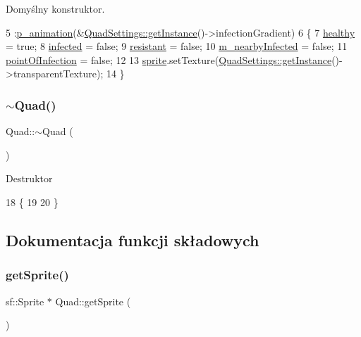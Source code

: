 Domyślny konstruktor. 
\begin{DoxyCode}
5           :\mbox{\hyperlink{class_quad_ace5b5f07a650f624aeb07806bc34d3f6}{p\_animation}}(&\mbox{\hyperlink{class_quad_settings_a20d7cfd0c56c11adcdf75c5e3011de67}{QuadSettings::getInstance}}()->infectionGradient)
6 \{
7     \mbox{\hyperlink{class_quad_a4994c09af588aeb08c482ea46494a08c}{healthy}} = \textcolor{keyword}{true};
8     \mbox{\hyperlink{class_quad_ae439ca631a9f51147b9d84a9c9df49c4}{infected}} = \textcolor{keyword}{false};
9     \mbox{\hyperlink{class_quad_ae2197ad46a2d7e409b2ca9e7ac25a80c}{resistant}} = \textcolor{keyword}{false};
10     \mbox{\hyperlink{class_quad_a6ccb745d5e70603957948d681b60e0f8}{m\_nearbyInfected}} = \textcolor{keyword}{false};
11     \mbox{\hyperlink{class_quad_a033c364211aab4e91aeb1609d4d890fe}{pointOfInfection}} = \textcolor{keyword}{false};
12 
13     \mbox{\hyperlink{class_quad_a83667bb824c1d6eca6c9c8b6e6d07d06}{sprite}}.setTexture(\mbox{\hyperlink{class_quad_settings_a20d7cfd0c56c11adcdf75c5e3011de67}{QuadSettings::getInstance}}()->transparentTexture);
14 \}
\end{DoxyCode}
\mbox{\label{class_quad_a5db77c0481b30c0b7c1014cc535284ad}} 
\subsubsection{\texorpdfstring{$\sim$\+Quad()}{~Quad()}}
{\footnotesize\ttfamily Quad\+::$\sim$\+Quad (\begin{DoxyParamCaption}{ }\end{DoxyParamCaption})}

Destruktor 
\begin{DoxyCode}
18 \{
19 
20 \}
\end{DoxyCode}


\subsection{Dokumentacja funkcji składowych}
\mbox{\label{class_quad_a35f20e65dd33bb5864f73575b04896e7}} 
\subsubsection{\texorpdfstring{get\+Sprite()}{getSprite()}}
{\footnotesize\ttfamily sf\+::\+Sprite $\ast$ Quad\+::get\+Sprite (\begin{DoxyParamCaption}{ }\end{DoxyParamCaption})}

